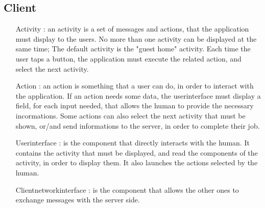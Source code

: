 	\subsection{Client}
	 \begin{itemize}
	  \item [Activity]: an activity is a set of messages and actions, that the application must display to the users.
	  No more than one activity can be displayed at the same time;
	  The default activity is the "guest home" activity. Each time the user taps a button, the application must execute
	  the related action, and select the next activity.
	  \item [Action]: an action is something that a user can do, in order to interact with the application.
	  If an action needs some data, the userinterface must display a field, for each input needed, that allows the human
	  to provide the necessary incormations.
	  Some actions can also select the next activity that must be shown, or/and send informations to the server,
	  in order to complete their job.
	  \item [Userinterface]: is the component that directly interacts with the human.
	  It contains the activity that must be displayed, and read the components of the activity, in order to display them.
	  It also launches the actions selected by the human.
	  \item[Clientnetworkinterface]: is the component that allows the other ones to exchange messages with the server side.
	 \end{itemize}
